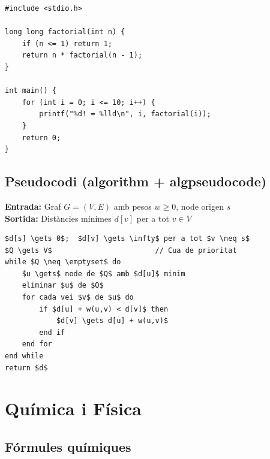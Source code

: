 \documentclass[informe, catalan]{practicaitic}
\theoremstyle{definition}
\theoremstyle{remark}
\begin{document}
\begin{lstlisting}[style=c, caption={Factorial recursiu en C}, label=cod:factorial]
#include <stdio.h>

long long factorial(int n) {
    if (n <= 1) return 1;
    return n * factorial(n - 1);
}

int main() {
    for (int i = 0; i <= 10; i++) {
        printf("%d! = %lld\n", i, factorial(i));
    }
    return 0;
}
\end{lstlisting}

\subsection{Pseudocodi (algorithm + algpseudocode)}


\begin{tcolorbox}[title=Algorisme 1: Dijkstra, colback=gray!5,
    colframe=myblue, fonttitle=\bfseries, label=alg:dijkstra]
\textbf{Entrada:} Graf $G=(V,E)$ amb pesos $w \geq 0$, node origen $s$\\
\textbf{Sortida:} Distàncies mínimes $d[v]$ per a tot $v \in V$
\begin{lstlisting}[style=pseudo]
$d[s] \gets 0$;  $d[v] \gets \infty$ per a tot $v \neq s$
$Q \gets V$                        // Cua de prioritat
while $Q \neq \emptyset$ do
    $u \gets$ node de $Q$ amb $d[u]$ minim
    eliminar $u$ de $Q$
    for cada vei $v$ de $u$ do
        if $d[u] + w(u,v) < d[v]$ then
            $d[v] \gets d[u] + w(u,v)$
        end if
    end for
end while
return $d$
\end{lstlisting}
\end{tcolorbox}


\section{Química i Física}

\subsection{Fórmules químiques}
\end{document}
